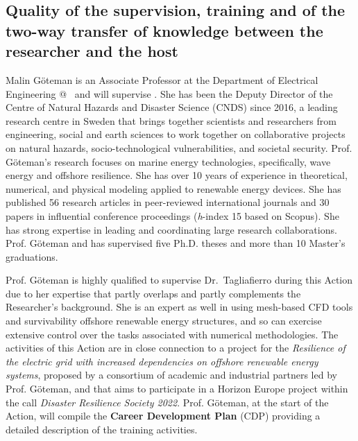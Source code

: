 
\subsection{Quality of the supervision, training and of the two-way transfer of knowledge between the researcher and the host}
\label{sec:training}

Malin Göteman is an Associate Professor at the Department of Electrical Engineering @ \UU\ and will supervise \nameAction. She has been the Deputy Director of the Centre of Natural Hazards and Disaster Science (CNDS) since 2016, a leading research centre in Sweden that brings together scientists and researchers from engineering, social and earth sciences to work together on collaborative projects on natural hazards, socio-technological vulnerabilities, and societal security. Prof. Göteman's research focuses on marine energy technologies, specifically, wave energy and offshore resilience. She has over 10 years of experience in theoretical, numerical, and physical modeling applied to renewable energy devices. She has published 56 research articles in peer-reviewed international journals and 30 papers in influential conference proceedings (\textit{h}-index 15 based on Scopus). She has strong expertise in leading and coordinating large research collaborations. Prof. Göteman and has supervised five Ph.D. theses and more than 10 Master's graduations.

Prof. Göteman is highly qualified to supervise Dr.~Tagliafierro during this Action due to her expertise that partly overlaps and partly complements the Researcher's background. She is an expert as well in using mesh-based CFD tools and survivability offshore renewable energy structures, and so can exercise extensive control over the tasks associated with numerical methodologies. The activities of this Action are in close connection to a project for the \textit{Resilience of the electric grid with increased dependencies on offshore renewable energy systems}, proposed by a consortium of academic and industrial partners led by Prof. Göteman, and that aims to participate in a Horizon Europe project within the call \textit{Disaster Resilience Society 2022}. Prof. Göteman, at the start of the Action, will compile the \textbf{Career Development Plan} (CDP) providing a detailed description of the training activities.

